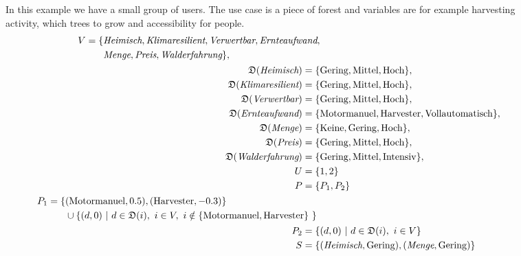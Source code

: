 \begin{figure}
    \begin{mdframed}[frametitle={Example for Forest Use Case}]
        In this example we have a small group of users. The use case is a piece of forest and variables are for example harvesting activity, which trees to grow and accessibility for people.
        \begin{align}
            \begin{split}
                V = \{ & \textit{Heimisch}, \textit{Klimaresilient}, \textit{Verwertbar}, \textit{Ernteaufwand}, \\
                & \textit{Menge}, \textit{Preis}, \textit{Walderfahrung} \},
            \end{split} \notag \\
            \mathfrak{D}(\textit{Heimisch}) =  \{ & \text{Gering}, \text{Mittel}, \text{Hoch}\}, \notag \\
            \mathfrak{D}(\textit{Klimaresilient}) = \{ & \text{Gering}, \text{Mittel}, \text{Hoch}\}, \notag \\
            \mathfrak{D}(\textit{Verwertbar}) = \{ & \text{Gering}, \text{Mittel}, \text{Hoch}\}, \notag \\
            \mathfrak{D}(\textit{Ernteaufwand}) = \{ & \text{Motormanuel}, \text{Harvester}, \text{Vollautomatisch}\}, \notag \\
            \mathfrak{D}(\textit{Menge}) = \{ & \text{Keine}, \text{Gering}, \text{Hoch}\}, \notag \\
            \mathfrak{D}(\textit{Preis}) = \{ & \text{Gering}, \text{Mittel}, \text{Hoch}\}, \notag\\
            \mathfrak{D}(\textit{Walderfahrung}) = \{ & \text{Gering}, \text{Mittel}, \text{Intensiv}\},\notag \\
            U = \{ & 1,2\} \notag\\
            P = \{ & P_1, P_2\} \notag\\
            \begin{split}
                P_1 = \{ & (\text{Motormanuel}, 0.5), (\text{Harvester}, -0.3) \} \\ 
                & \cup \{ (d,0)\ |\ d \in \mathfrak{D}(i),\ i \in V,\ i \notin \{ \text{Motormanuel}, \text{Harvester}\} \ \} \ 
            \end{split} \notag \\
            P_2 = \{ & (d,0)\ |\ d \in \mathfrak{D}(i),\ i \in V \} \notag \\
            S  =  \{ & (\textit{Heimisch}, \text{Gering}), (\textit{Menge}, \text{Gering}) \} \notag \\

\end{align}
\end{mdframed}
\end{figure}
